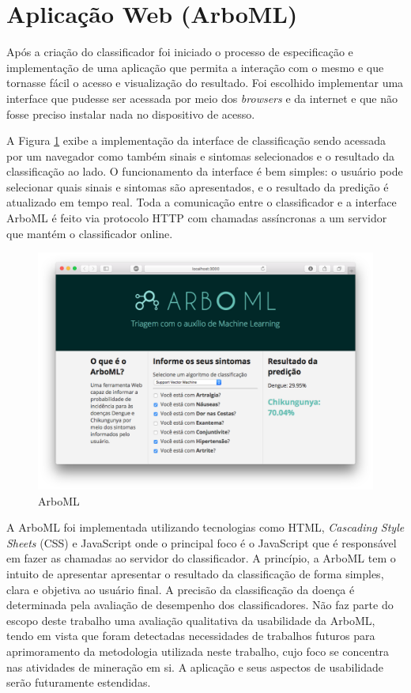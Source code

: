\section{Aplicação Web (ArboML)}

Após a criação do classificador foi iniciado o processo de especificação e implementação de uma aplicação que permita a interação com o mesmo e que tornasse fácil o acesso e visualização do resultado. Foi escolhido implementar uma interface que pudesse ser acessada por meio dos \textit{browsers} e da internet e que não fosse preciso instalar nada no dispositivo de acesso.

A Figura \ref{fig:arboml} exibe a implementação da interface de classificação sendo acessada por um navegador como também sinais e sintomas selecionados e o resultado da classificação ao lado. O funcionamento da interface é bem simples: o usuário pode selecionar quais sinais e sintomas são apresentados, e o resultado da predição é atualizado em tempo real. Toda a comunicação entre o classificador e a interface ArboML é feito via protocolo HTTP com chamadas assíncronas a um servidor que mantém o classificador online.

\begin{figure}[htb]
  \caption{\label{fig:arboml}ArboML}
  \begin{center}
    \includegraphics[scale=0.46]{imagens/arboML.png}
  \end{center}
\end{figure}
\newpage

A ArboML foi implementada utilizando tecnologias como HTML, \textit{Cascading Style Sheets} (CSS) e JavaScript onde o principal foco é o JavaScript que é responsável em fazer as chamadas ao servidor do classificador. A princípio, a ArboML tem o intuito de apresentar  apresentar o resultado da classificação de forma simples, clara e objetiva ao usuário final. A precisão da classificação da doença é determinada pela avaliação de desempenho dos classificadores. Não faz parte do escopo deste trabalho uma avaliação qualitativa da usabilidade da ArboML, tendo em vista que foram detectadas necessidades de trabalhos futuros para aprimoramento da metodologia utilizada neste trabalho, cujo foco se concentra nas atividades de mineração em si. A aplicação e seus aspectos de usabilidade serão futuramente estendidas.

